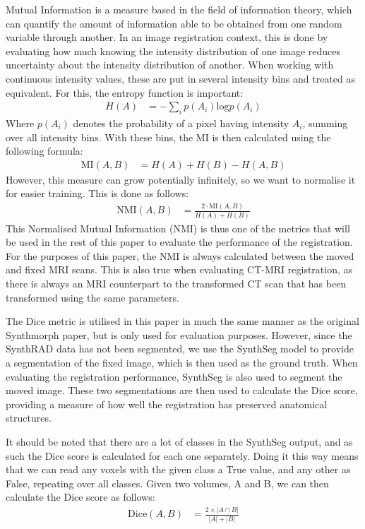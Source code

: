 Mutual Information is a measure based in the field of information theory, which can quantify the amount of information able to be obtained from one random variable through another. In an image registration context, this is done by evaluating how much knowing the intensity distribution of one image reduces uncertainty about the intensity distribution of another. When working with continuous intensity values, these are put in several intensity bins and treated as equivalent. For this, the entropy function is important:
\begin{align*}
  H(A) &= -\sum_ip(A_i)\text{log}p(A_i)
\end{align*}
Where $p(A_i)$ denotes the probability of a pixel having intensity $A_i$, summing over all intensity bins. With these bins, the MI is then calculated using the following formula:
\begin{align*}
  \text{MI}(A,B) &= H(A) + H(B) - H(A,B)
\end{align*}
However, this measure can grow potentially infinitely, so we want to normalise it for easier training. This is done as follows:
\begin{align*}
  \text{NMI}(A,B) &= \frac{2\cdot\text{MI}(A,B)}{H(A)+H(B)}
\end{align*}
This Normalised Mutual Information (NMI) is thus one of the metrics that will be used in the rest of this paper to evaluate the performance of the registration. For the purposes of this paper, the NMI is always calculated between the moved and fixed MRI scans. This is also true when evaluating CT-MRI registration, as there is always an MRI counterpart to the transformed CT scan that has been transformed using the same parameters.

The Dice metric is utilised in this paper in much the same manner as the original Synthmorph paper, but is only used for evaluation purposes. However, since the SynthRAD data has not been segmented, we use the SynthSeg model to provide a segmentation of the fixed image, which is then used as the ground truth. When evaluating the registration performance, SynthSeg is also used to segment the moved image. These two segmentations are then used to calculate the Dice score, providing a measure of how well the registration has preserved anatomical structures.

It should be noted that there are a lot of classes in the SynthSeg output, and as such the Dice score is calculated for each one separately. Doing it this way means that we can read any voxels with the given class a True value, and any other as False, repeating over all classes. Given two volumes, A and B, we can then calculate the Dice score as follows:
\begin{align}
\text{Dice}(A, B) &= \frac{2 \times |A \cap B|}{|A| + |B|}
\end{align}\label{eq:dice}

